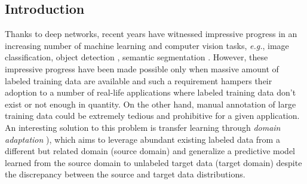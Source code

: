 \documentclass[10pt,twocolumn,letterpaper]{article}
\begin{document}
\begin{CJK*}{UTF8}{gkai}
\section{Introduction}



Thanks to deep networks, recent years have witnessed impressive progress in an increasing number of machine learning and computer vision tasks, \textit{e.g.},  image classification\cite{ILSVRC15,He2015}, object detection \cite{Everingham15,girshickICCV15fastrcnn}, semantic segmentation \cite{Cordts2016Cityscapes,Everingham15,zhao2016pspnet}. However, these impressive progress have been made possible only when massive amount of labeled training data are available and such a requirement hampers their adoption to a number of real-life applications where labeled training data don't exist or not enough in quantity. On the other hand, manual annotation of large training data could be extremely tedious and prohibitive for a given application. An interesting solution to this problem is transfer learning through \textit{domain adaptation} \cite{pan2010survey}), which aims to leverage abundant existing labeled data from a different but related domain (source domain) and generalize a predictive model learned from the source domain to unlabeled target data (target domain) despite the discrepancy between the source and target data distributions.       


\end{CJK*}
\end{document}
